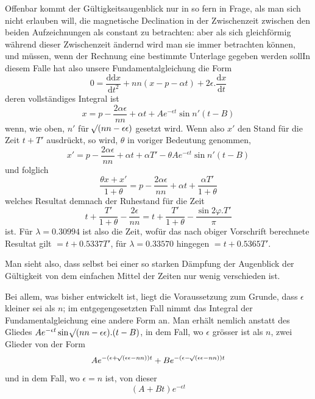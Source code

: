 Offenbar kommt der Gültigkeitsaugenblick nur in so fern in Frage, als man sich nicht erlauben will, die magnetische Declination in der Zwischenzeit zwischen den beiden Aufzeichnungen als constant zu betrachten: aber als sich gleichförmig während dieser Zwischenzeit ändernd wird man sie immer betrachten können, und müssen, wenn der Rechnung eine bestimmte Unterlage gegeben werden soll\quad In diesem Falle hat also unsere Fundamentalgleichung die Form
\[
0=\frac{\mathrm{d}\mathrm{d}x}{\mathrm{d}t^2}+nn(x-p-\alpha t)+2\epsilon.\frac{\mathrm{d}x}{\mathrm{d}t}
\]
deren vollständiges Integral ist
\[
x=p-\frac{2\alpha\epsilon}{nn}+\alpha t+Ae^{-\epsilon t}\sin n'(t-B)
\]
wenn, wie oben, $n'$ für $\mathord{{}^{}\!\surd}(nn-\epsilon\epsilon)$ gesetzt wird. Wenn also $x'$ den Stand für die Zeit $t+T'$ ausdrückt, so wird, $\theta$ in voriger Bedeutung genommen,
\[
x'=p-\frac{2\alpha\epsilon}{nn}+\alpha t+\alpha T'-\theta Ae^{-\epsilon t}\sin n'(t-B)
\]
und folglich
\[
\frac{\theta x+x'}{1+\theta}=p-\frac{2\alpha\epsilon}{nn}+\alpha t+\frac{\alpha T'}{1+\theta}
\]
welches Resultat demnach der Ruhestand für die Zeit
\[
t+\frac{T'}{1+\theta}-\frac{2\epsilon}{nn}=t+\frac{T'}{1+\theta}-\frac{\sin2\varphi.T'}{\pi}
\]
ist. Für $\lambda=0.30994$ ist also die Zeit, wofür das nach obiger Vorschrift berechnete Resultat gilt $=t+0.5337T'$, für $\lambda=0.33570$ hingegen $=t+0.5365T'$.
\par{}
\par\clearpage
{}
\noindent Man sieht also, dass selbst bei einer so starken Dämpfung der Augenblick der Gültigkeit von dem einfachen Mittel der Zeiten nur wenig verschieden ist.

Bei allem, was bisher entwickelt ist, liegt die Voraussetzung zum Grunde, dass $\epsilon$ kleiner sei als $n$; im entgegengesetzten Fall nimmt das Integral der Fundamentalgleichung eine andere Form an. Man erhält nemlich anstatt des Gliedes $Ae^{-\epsilon t}\sin\mathord{{}^{}\!\surd}(nn-\epsilon\epsilon).(t-B)$, in dem Fall, wo $\epsilon$ grösser ist als $n$, zwei Glieder von der Form
\[
Ae^{-(\epsilon+\mathord{{}^{}\!\surd}(\epsilon\epsilon-nn))t}+Be^{-(\epsilon-\mathord{{}^{}\!\surd}(\epsilon\epsilon-nn))t}
\]
und in dem Fall, wo $\epsilon=n$ ist, von dieser
\[
(A+Bt)e^{-\epsilon t}
\]

